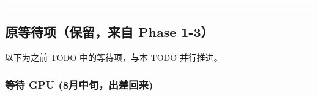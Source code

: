 \documentclass[
  12pt,
]{ctexart}
\begin{document}
\begin{center}\rule{0.5\linewidth}{0.5pt}\end{center}

\subsection{原等待项（保留，来自 Phase
1-3）}\label{ux539fux7b49ux5f85ux9879ux4fddux7559ux6765ux81ea-phase-1-3}

以下为之前 TODO 中的等待项，与本 TODO 并行推进。

\subsubsection{等待 GPU
(8月中旬，出差回来)}\label{ux7b49ux5f85-gpu-8ux6708ux4e2dux65ecux51faux5deeux56deux6765}
\end{document}
